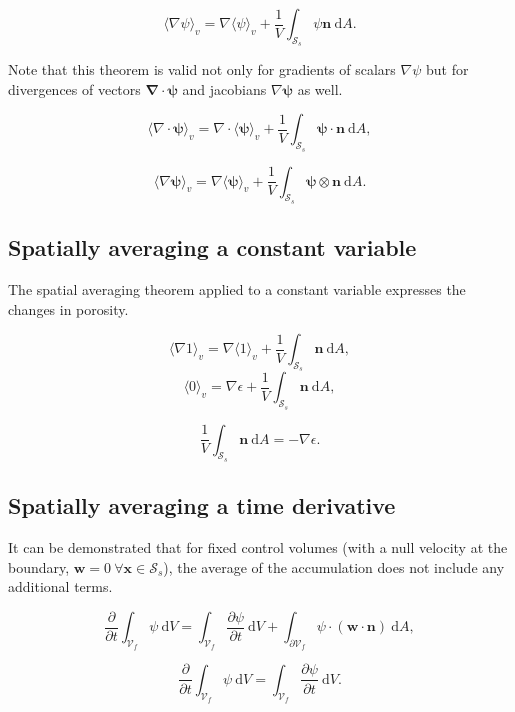 \documentclass[a4paper,11pt]{article}
\begin{document}
\begin{equation}\label{eq:averaging-theorem}
  \boxed{\langle\nabla\psi\rangle_v = \nabla\langle\psi\rangle_v + \frac{1}{V}\int_{\mathcal S_s}\psi\bm n~\mathrm dA.}
\end{equation}

Note that this theorem is valid not only for gradients of scalars ${\nabla\psi}$ but for divergences of vectors ${\bm\nabla\cdot\bm\psi}$ and jacobians ${\nabla\bm\psi}$ as well.

$$\langle\nabla\cdot\bm\psi\rangle_v = \nabla\cdot\langle\bm\psi\rangle_v + \frac{1}{V}\int_{\mathcal S_s}\bm\psi\cdot\bm n~\mathrm dA,$$

$$\langle\nabla\bm\psi\rangle_v = \nabla\langle\bm\psi\rangle_v + \frac{1}{V}\int_{\mathcal S_s}\bm\psi\otimes\bm n~\mathrm dA.$$

\subsection{Spatially averaging a constant variable}

The spatial averaging theorem applied to a constant variable expresses the changes in porosity.

$$\langle\nabla 1\rangle_v = \nabla\langle1\rangle_v + \frac{1}{V}\int_{\mathcal S_s}\bm n~\mathrm dA,$$
$$\langle 0\rangle_v = \nabla\epsilon + \frac{1}{V}\int_{\mathcal S_s}\bm n~\mathrm dA,$$

\begin{equation}\label{eq:average-empty}
  \boxed{\frac{1}{V}\int_{\mathcal S_s}\bm n~\mathrm dA = -\nabla\epsilon.}
\end{equation}

\subsection{Spatially averaging a time derivative}

It can be demonstrated that for fixed control volumes (with a null velocity at the boundary, ${\bm w=0}\ \forall\bm x\in\mathcal S_s$), the average of the accumulation does not include any additional terms.

$$\frac{\partial}{\partial t}\int_{\mathcal V_f}\psi~\mathrm dV = \int_{\mathcal V_f}\frac{\partial\psi}{\partial t}~\mathrm dV + \int_{\partial\mathcal V_f}\psi \cdot(\bm w\cdot\bm n)~\mathrm dA,$$

\begin{equation}\label{eq:average-accumulation}
  \boxed{\frac{\partial}{\partial t}\int_{\mathcal V_f}\psi~\mathrm dV = \int_{\mathcal V_f}\frac{\partial\psi}{\partial t}~\mathrm dV.}
\end{equation}
\end{document}
